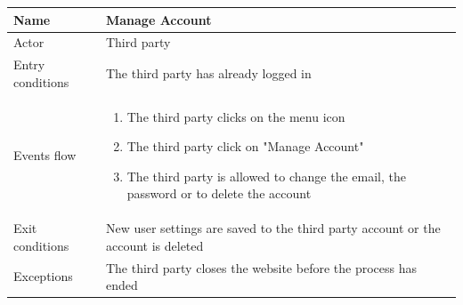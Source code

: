 \documentclass{article}
\begin{document}
\begin{table}[H]
    \begin{tabular}{|l|l|}
    \hline
    Name & \begin{minipage}[t]{0.7\textwidth}\textbf{Manage Account} \end{minipage} \\ \hline  
    Actor & \begin{minipage}[t]{0.7\textwidth}Third party\end{minipage} \\ \hline 
    Entry conditions & \begin{minipage}[t]{0.7\textwidth} The third party has already logged in \end{minipage} \\
    \hline 
    Events flow & \begin{minipage}[t]{0.7\textwidth}
    \begin{enumerate}
        \item The third party clicks on the menu icon
        \item The third party click on "Manage Account"
        \item The third party is allowed to change the email, the password or to
        delete the account
    \end{enumerate}
    \end{minipage} \\ \hline
    Exit conditions & \begin{minipage}[t]{0.7\textwidth} New user settings are
    saved to the third party account or the account is deleted\end{minipage} \\
    \hline
    Exceptions & \begin{minipage}[t]{0.7\textwidth}The third party closes the
    website before the process has ended \end{minipage} \\ \hline
    \end{tabular}
\end{table}
\end{document}
